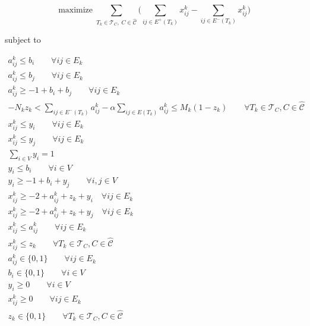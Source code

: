 \begin{equation}
	\label{eq:d-ecp-objective}
	\text{maximize} \; \sum_{ T_{k} \in \mathcal{T}_{C}, \; C \in
		\mathcal{\hat{C}} } \big( \sum^{}_{ij \in E^{+} (T_{k})} x_{ij}
		^{k} - \sum_{ij \in E^{-} (T_{k})} x_{ij} ^{k} \big)
\end{equation} \begin{center} subject to \end{center}
\begin{gather}
	\label{eq:d-ecp-a-ij-l-bi}
	a_{ij}^{k} \leq b_{i} \quad\quad \forall ij \in E_k \\
	\label{eq:d-ecp-a-ij-l-bj}
	a_{ij}^{k} \leq b_{j} \quad\quad \forall ij \in E_k \\
	\label{eq:d-ecp-a-ij-g-ijk}
	a _{ij} ^{k} \geq - 1 + b_i + b_j \quad\quad \forall ij \in E_k \\
	\label{eq:d-ecp-alpha-constraint}
	-N_{k} z_k < \sum^{}_{ij \in E^{-} (T_k)} a_{ij}^{k}  - \alpha \sum^{}_{ij \in E(T_k)}
	a_{ij} ^{k}  \leq M_k (1 - z_k) \quad\quad \forall T_{k} \in \mathcal{T} _{C}, C \in
	\hat{\mathcal{C}} \\
	\label{eq:d-ecp-edge-charikar1}
	x _{ij}^{k}  \leq y_i \quad\quad \forall ij \in E_{k} \\
	\label{eq:d-ecp-edge-charikar2}
	x _{ij} ^{k} \leq y_j \quad\quad \forall ij \in E_k \\
	\label{eq:d-ecp-vertex-charikar1}
	\sum^{}_{i \in V} y_i = 1 \\
	\label{eq:d-ecp-vertex-l-b}
	y_i \leq b_i \quad\quad \forall i \in V \\
	\label{eq:d-ecp-vertex-g-bi-yj}
	y_i \geq -1 + b_i + y_j \quad\quad \forall i,j \in V \\
	\label{eq:d-ecp-x-l-sum1}
	x_{ij}^{k} \geq -2 + a_{ij} ^{k} + z_k + y_i \quad \forall ij \in E_k \\
	\label{eq:d-ecp-x-l-sum2}
	x_{ij}^{k} \geq -2 + a_{ij} ^{k} + z_k + y_j \quad \forall ij \in E_k \\
	\label{eq:d-ecp-x-l-a}
	x_{ij} ^{k} \leq a_{ij} ^{k} \quad\quad \forall ij \in E_k \\
	\label{eq:d-ecp-x-l-z}
	x_{ij} ^{k} \leq z_k \quad\quad \forall T_{k} \in \mathcal{T} _{C}, C \in
	\hat{\mathcal{C}}  \\
	\label{eq:d-ecp-a-ij}
	a _{ij} ^{k}  \in \{0, 1\} \quad\quad \forall ij \in E_k\\
	\label{eq:d-ecp-b-i}
	b _{i} \in \{0, 1\} \quad\quad \forall i \in V \\
	\label{eq:d-ecp-y-i}
	y _{i} \geq 0 \quad\quad \forall i \in V \\
	\label{eq:d-ecp-x-ij}
	x _{ij} ^{k}  \geq 0 \quad\quad \forall ij \in E_k\\
	\label{eq:d-ecp-z-k}
	z _{k} \in \{0, 1\} \quad\quad \forall T_{k} \in \mathcal{T} _{C}, C \in
	\hat{\mathcal{C}}
\end{gather}

